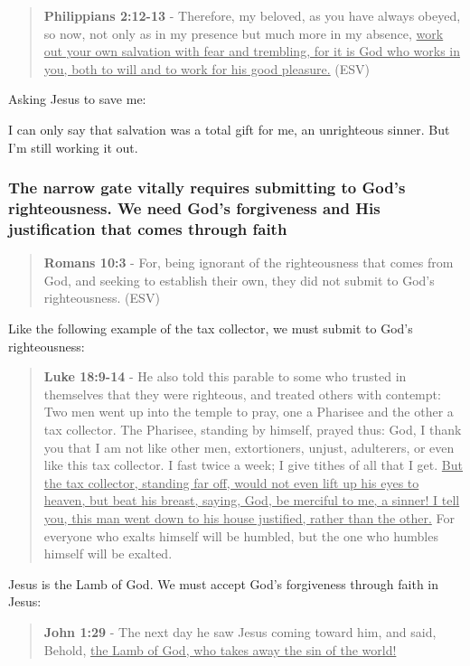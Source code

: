\documentclass[11pt]{article}
\begin{document}
\begin{quote}
\textbf{Philippians 2:12-13} - Therefore, my beloved, as you have always obeyed, so now, not only as in my presence but much more in my absence, \uline{work out your own salvation with fear and trembling, for it is God who works in you, both to will and to work for his good pleasure.} (ESV)
\end{quote}

Asking Jesus to save me:

I can only say that salvation was a total gift for me, an unrighteous sinner. But I'm still working it out.

\subsubsection{The narrow gate vitally requires submitting to God's righteousness. We need God's forgiveness and His justification that comes through faith}
\label{sec:orgef3a602}
\begin{quote}
\textbf{Romans 10:3} - For, being ignorant of the righteousness that comes from God, and seeking to establish their own, they did not submit to God's righteousness. (ESV)
\end{quote}

Like the following example of the tax collector, we must submit to God's righteousness:

\begin{quote}
\textbf{Luke 18:9-14} - He also told this parable to some who trusted in themselves that they were righteous, and treated others with contempt: Two men went up into the temple to pray, one a Pharisee and the other a tax collector. The Pharisee, standing by himself, prayed thus: God, I thank you that I am not like other men, extortioners, unjust, adulterers, or even like this tax collector. I fast twice a week; I give tithes of all that I get. \uline{But the tax collector, standing far off, would not even lift up his eyes to heaven, but beat his breast, saying, God, be merciful to me, a sinner! I tell you, this man went down to his house justified, rather than the other.} For everyone who exalts himself will be humbled, but the one who humbles himself will be exalted.
\end{quote}

Jesus is the Lamb of God. We must accept God's forgiveness through faith in Jesus:

\begin{quote}
\textbf{John 1:29} - The next day he saw Jesus coming toward him, and said, Behold, \uline{the Lamb of God, who takes away the sin of the world!}
\end{quote}
\end{document}
